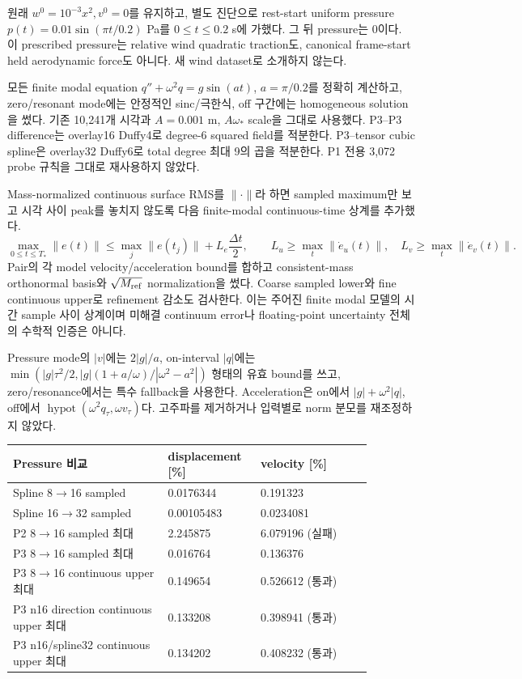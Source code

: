 \documentclass[10pt]{article}
\begin{document}
원래 \(w^0=10^{-3}x^2,v^0=0\)를 유지하고, 별도 진단으로 rest-start uniform pressure
\(p(t)=0.01\sin(\pi t/0.2)\) Pa를 \(0\le t\le0.2\) s에 가했다.
그 뒤 pressure는 0이다. 이 prescribed pressure는 relative wind quadratic traction도,
canonical frame-start held aerodynamic force도 아니다. 새 wind dataset로 소개하지 않는다.

모든 finite modal equation \(q''+\omega^2q=g\sin(at)\), \(a=\pi/0.2\)를 정확히 계산하고,
zero/resonant mode에는 안정적인 sinc/극한식, off 구간에는 homogeneous solution을 썼다.
기존 10,241개 시각과 \(A=0.001\) m, \(A\omega_*\) scale을 그대로 사용했다.
P3--P3 difference는 overlay16 Duffy4로 degree-6 squared field를 적분한다.
P3--tensor cubic spline은 overlay32 Duffy6로 total degree 최대 9의 곱을 적분한다.
P1 전용 3,072 probe 규칙을 그대로 재사용하지 않았다.

Mass-normalized continuous surface RMS를 \(\|\cdot\|\)라 하면 sampled maximum만 보고
시각 사이 peak를 놓치지 않도록 다음 finite-modal continuous-time 상계를 추가했다.
\[
 \max_{0\le t\le T_*}\|e(t)\|
 \le \max_j\|e(t_j)\|+L_e\frac{\Delta t}{2},\qquad
 L_u\ge\max_t\|\dot e_u(t)\|,\quad L_v\ge\max_t\|\dot e_v(t)\|.
\]
Pair의 각 model velocity/acceleration bound를 합하고 consistent-mass orthonormal basis와
\(\sqrt{M_{\rm ref}}\) normalization을 썼다. Coarse sampled lower와 fine continuous upper로
refinement 감소도 검사한다. 이는 주어진 finite modal 모델의 시간 sample 사이 상계이며
미해결 continuum error나 floating-point uncertainty 전체의 수학적 인증은 아니다.

Pressure mode의 \(|v|\)에는 \(2|g|/a\), on-interval \(|q|\)에는
\(\min(|g|\tau^2/2, |g|(1+a/\omega)/|\omega^2-a^2|)\) 형태의 유효 bound를 쓰고,
zero/resonance에서는 특수 fallback을 사용한다. Acceleration은 on에서
\(|g|+\omega^2|q|\), off에서 \(\operatorname{hypot}(\omega^2q_\tau,\omega v_\tau)\)다.
고주파를 제거하거나 입력별로 norm 분모를 재조정하지 않았다.

\begin{longtable}{L{0.39\linewidth}L{0.20\linewidth}L{0.29\linewidth}}
\toprule Pressure 비교 & displacement [\%] & velocity [\%]\\\midrule
Spline 8$\to$16 sampled & 0.0176344 & 0.191323\\
Spline 16$\to$32 sampled & 0.00105483 & 0.0234081\\
P2 8$\to$16 sampled 최대 & 2.245875 & 6.079196 (실패)\\
P3 8$\to$16 sampled 최대 & 0.016764 & 0.136376\\
P3 8$\to$16 continuous upper 최대 & 0.149654 & 0.526612 (통과)\\
P3 n16 direction continuous upper 최대 & 0.133208 & 0.398941 (통과)\\
P3 n16/spline32 continuous upper 최대 & 0.134202 & 0.408232 (통과)\\
\bottomrule\end{longtable}
\end{document}
